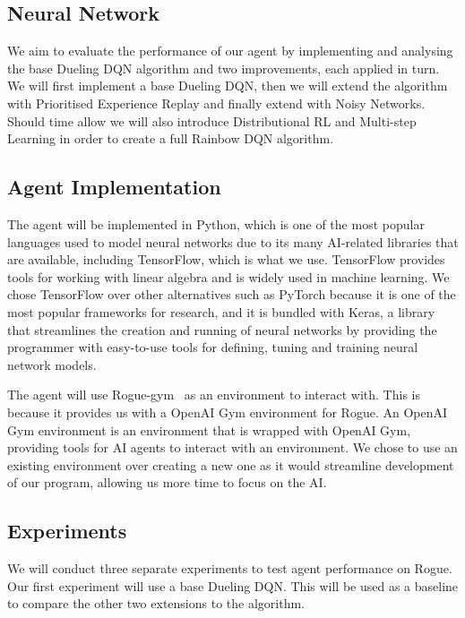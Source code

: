 \documentclass[12pt,a4paper]{article}
\begin{document}
    \subsection{Neural Network}\label{subsec:neural-network}
    We aim to evaluate the performance of our agent by implementing and analysing the base Dueling DQN algorithm and two improvements, each applied in turn.
    We will first implement a base Dueling DQN, then we will extend the algorithm with Prioritised Experience Replay and finally extend with Noisy Networks.
    Should time allow we will also introduce Distributional RL and Multi-step Learning in order to create a full Rainbow DQN algorithm.



    \subsection{Agent Implementation}\label{subsec:implementation}
    The agent will be implemented in Python, which is one of the most popular languages used to model neural networks due to its many AI-related libraries that are available, including TensorFlow, which is what we use.
    TensorFlow provides tools for working with linear algebra and is widely used in machine learning.
    We chose TensorFlow over other alternatives such as PyTorch because it is one of the most popular frameworks for research,
    and it is bundled with Keras, a library that streamlines the creation and running of neural networks by providing the programmer with
    easy-to-use tools for defining, tuning and training neural network models.

    The agent will use Rogue-gym~\citep{kanagawa19} as an environment to interact with.
    This is because it provides us with a OpenAI Gym environment for Rogue.
    An OpenAI Gym environment is an environment that is wrapped with OpenAI Gym, providing tools for AI agents to interact with an environment.
    We chose to use an existing environment over creating a new one as it would streamline development of our program, allowing us more time to focus on the AI.
    
    \subsection{Experiments}\label{subsec:experiments}
    We will conduct three separate experiments to test agent performance on Rogue.
    Our first experiment will use a base Dueling DQN.
    This will be used as a baseline to compare the other two extensions to the algorithm.
\end{document}
